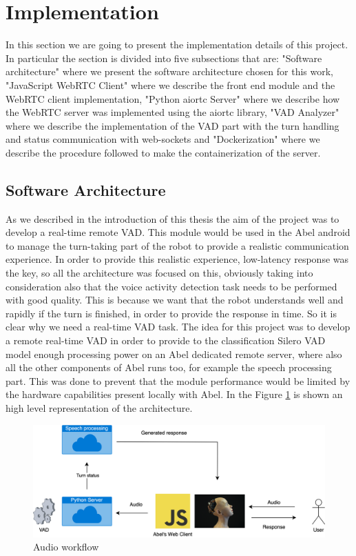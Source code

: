 \documentclass[../main.tex]{subfiles}
\begin{document}
\section{Implementation}
\label{implementation}

In this section we are going to present the implementation details of this project. In particular the section is divided into five subsections that are: "Software architecture" where we present the software architecture chosen for this work, "JavaScript WebRTC Client" where we describe the front end module and the WebRTC client implementation, "Python aiortc Server" where we describe how the WebRTC server was implemented using the aiortc library, "VAD Analyzer" where we describe the implementation of the VAD part with the turn handling and status communication with web-sockets and "Dockerization" where we describe the procedure followed to make the containerization of the server.

\subsection{Software Architecture}
\label{software architecture}

As we described in the introduction of this thesis the aim of the project was to develop a real-time remote VAD. This module would be used in the Abel android to manage the turn-taking part of the robot to provide a realistic communication experience. In order to provide this realistic experience, low-latency response was the key, so all the architecture was focused on this, obviously taking into consideration also that the voice activity detection task needs to be performed with good quality. This is because we want that the robot understands well and rapidly if the turn is finished, in order to provide the response in time. So it is clear why we need a real-time VAD task. The idea for this project was to develop a remote real-time VAD in order to provide to the classification Silero VAD model enough processing power on an Abel dedicated remote server, where also all the other components of Abel runs too, for example the speech processing part. This was done to prevent that the module performance would be limited by the hardware capabilities present locally with Abel. In the Figure \ref{fig:audio workflow} is shown an high level representation of the architecture.

\begin{figure}[ht]
    \centering
    \includegraphics[width=\textwidth]{images/Audio architecture 2.png}
    \caption{Audio workflow}
    \label{fig:audio workflow}
\end{figure}
\end{document}
